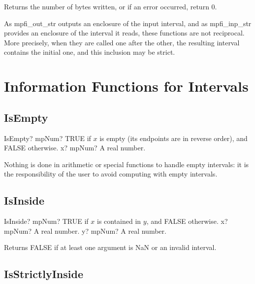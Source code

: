 Returns the number of bytes written, or if an error occurred, return 0.

As mpfi\_out\_str outputs an enclosure of the input interval, and as mpfi\_inp\_str provides
an enclosure of the interval it reads, these functions are not reciprocal. More precisely, when
they are called one after the other, the resulting interval contains the initial one, and this
inclusion may be strict.



\section{Information Functions for Intervals}
\label{InformationFunctionsForIntervals}



\subsection{IsEmpty}

\begin{mpFunctionsExtract}
	\mpFunctionOne
	{IsEmpty? mpNum? TRUE  if $x$ is empty (its endpoints are in reverse order), and FALSE otherwise.}
	{x? mpNum? A real number.}
\end{mpFunctionsExtract}

\vspace{0.3cm}
Nothing is done in arithmetic or special functions to handle empty intervals: it is the responsibility of the user to avoid computing with empty intervals.




\subsection{IsInside}

\begin{mpFunctionsExtract}
	\mpFunctionTwo
	{IsInside? mpNum? TRUE  if $x$ is contained in $y$, and FALSE otherwise.}
	{x? mpNum? A real number.}
	{y? mpNum? A real number.}
\end{mpFunctionsExtract}

\vspace{0.3cm}
Returns FALSE if at least one argument is NaN or an invalid interval.




\subsection{IsStrictlyInside}


